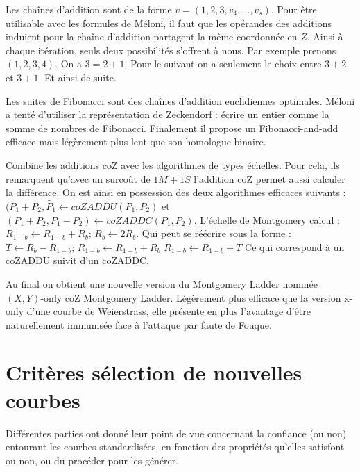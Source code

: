\documentclass[a4paper]{report}
\begin{document}
Les chaînes d'addition sont de la forme $v = (1, 2, 3, v_4, \ldots, v_s)$. Pour être utilisable avec les formules de Méloni, il faut que les opérandes des additions induient pour la chaîne d'addition partagent la même coordonnée en $Z$. Ainsi à chaque itération, seuls deux possibilités s'offrent à nous. Par exemple prenons $(1, 2, 3, 4)$. On a $3 = 2 + 1$. Pour le suivant on a seulement le choix entre $3 + 2$ et $3 + 1$. Et ainsi de suite.

Les suites de Fibonacci sont des chaînes d'addition euclidiennes optimales. Méloni a tenté d'utiliser la représentation de Zeckendorf : écrire un entier comme la somme de nombres de Fibonacci. Finalement il propose un Fibonacci-and-add efficace mais légèrement plus lent que son homologue binaire. 

Combine les additions coZ avec les algorithmes de types échelles. Pour cela, ils remarquent qu'avec un surcoût de $1M + 1S$ l'addition coZ permet aussi calculer la différence. On est ainsi en possession des deux algorithmes efficaces suivants : 
$(P_1 + P_2, \tilde{P_1} \leftarrow coZADDU(P_1, P_2)$ et $(P_1 + P_2, P_1 - P_2) \leftarrow coZADDC(P_1, P_2)$.
L'échelle de Montgomery calcul : $R_{1-b} \leftarrow R_{1-b} + R_b$; $R_b \leftarrow 2R_b$. 
Qui peut se réécrire sous la forme : 
$T \leftarrow R_{b} - R_{1-b}$; $R_{1-b} \leftarrow R_{1-b} + R_b$
$R_{1-b} \leftarrow R_{1-b} + T$
Ce qui correspond à un coZADDU suivit d'un coZADDC.

Au final on obtient une nouvelle version du Montgomery Ladder nommée $(X, Y)$-only coZ Montgomery Ladder. Légèrement plus efficace que la version x-only d'une courbe de Weierstrass, elle présente en plus l'avantage d'être naturellement immunisée face à l'attaque par faute de Fouque.


\section{Critères sélection de nouvelles courbes}
Différentes parties ont donné leur point de vue concernant la confiance (ou non) entourant les courbes standardisées, en fonction des propriétés qu'elles satisfont ou non, ou du procéder pour les générer. 

          

                 
\end{document}
